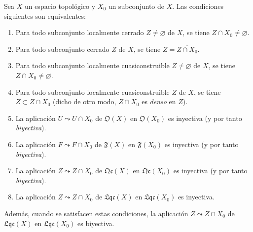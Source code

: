 \begin{proposition}[10.1.2]
\label{IV.10.1.2}
Sea $X$ un espacio topológico y $X_0$ un subconjunto de $X$.
Las condiciones siguientes son equivalentes:
\begin{enumerate}[label=\emph{\alph*)}]
  \item Para todo subconjunto localmente cerrado $Z\neq\varnothing$ de $X$, se tiene $Z\cap X_0\neq\varnothing$.
  \item[\rm a$'$)] Para todo subconjunto cerrado $Z$ de $X$, se tiene $Z=\overline{Z\cap X_0}$.
  \item Para todo subconjunto localmente cuasiconstruible $Z\neq\varnothing$ de $X$, se tiene $Z\cap X_0\neq\varnothing$.
  \item[\rm b$'$)] Para todo subconjunto localmente cuasiconstruible $Z$ de $X$, se tiene $Z\subset\overline{Z\cap X_0}$ \textup{(dicho de otro modo, $Z\cap X_0$ es \emph{denso} en $Z$)}.
  \item La aplicación $U\leadsto U\cap X_0$ de $\mathfrak O(X)$ en $\mathfrak O(X_0)$ es inyectiva \textup{(y por tanto \emph{biyectiva})}.
  \item[\rm c$'$)] La aplicación $F\leadsto F\cap X_0$ de $\mathfrak F(X)$ en $\mathfrak F(X_0)$ es inyectiva \textup{(y por tanto \emph{biyectiva})}.
  \item[\rm c$''$)] La aplicación $Z\leadsto Z\cap X_0$ de $\mathfrak{Qc}(X)$ en $\mathfrak{Qc}(X_0)$ es inyectiva \textup{(y por tanto \emph{biyectiva})}.
  \item[\rm c$'''$)] La aplicación $Z\leadsto Z\cap X_0$ de $\mathfrak{Lqc}(X)$ en $\mathfrak{Lqc}(X_0)$ es inyectiva.
\end{enumerate}
Además, cuando se satisfacen estas condiciones, la aplicación $Z\leadsto Z\cap X_0$ de $\mathfrak{Lqc}(X)$ en $\mathfrak{Lqc}(X_0)$ es biyectiva.
\end{proposition}

